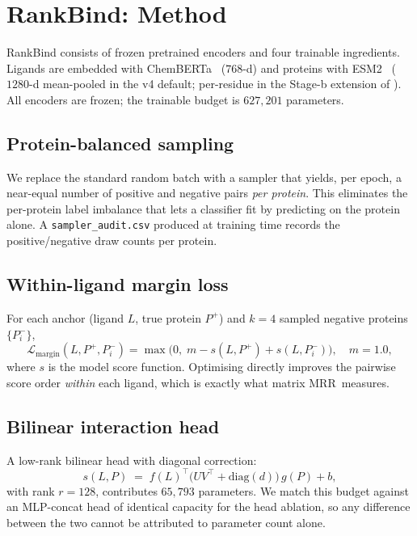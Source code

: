 \documentclass[11pt,a4paper]{article}
\newcommand{\method}{RankBind\xspace}
\newcommand{\matmrr}{matrix MRR}
\begin{document}
\section{\method: Method}
\label{sec:method}

\method consists of frozen pretrained encoders and four trainable
ingredients. Ligands are embedded with ChemBERTa~\citep{chithrananda2020chemberta}
($768$-d) and proteins with ESM2~\citep{lin2023esm2} ($1280$-d
mean-pooled in the v4 default; per-residue in the Stage-b extension of
). All encoders are frozen; the trainable budget is
$627{,}201$ parameters.

\subsection{Protein-balanced sampling}
We replace the standard random batch with a sampler that yields, per
epoch, a near-equal number of positive and negative pairs \emph{per
protein}. This eliminates the per-protein label imbalance that lets a
classifier fit by predicting on the protein alone. A
\texttt{sampler\_audit.csv} produced at training time records the
positive/negative draw counts per protein.

\subsection{Within-ligand margin loss}

For each anchor (ligand $L$, true protein $P^{+}$) and $k=4$ sampled
negative proteins $\{P^{-}_{i}\}$,
\begin{equation}
\mathcal{L}_{\text{margin}}(L, P^{+}, P^{-}_{i}) =
  \max\!\bigl(0,\; m - s(L, P^{+}) + s(L, P^{-}_{i})\bigr),
  \quad m = 1.0,
\label{eq:margin}
\end{equation}
where $s$ is the model score function. Optimising 
directly improves the pairwise score order \emph{within} each ligand,
which is exactly what \matmrr\ measures.

\subsection{Bilinear interaction head}

A low-rank bilinear head with diagonal correction:
\begin{equation}
s(L, P) \;=\; f(L)^{\top}\bigl(UV^{\top} + \mathrm{diag}(d)\bigr)\, g(P) + b,
\label{eq:bilinear}
\end{equation}
with rank $r=128$, contributes $65{,}793$ parameters. We match this
budget against an MLP-concat head of identical capacity for the head
ablation, so any difference between the two cannot be attributed to
parameter count alone.
\end{document}
